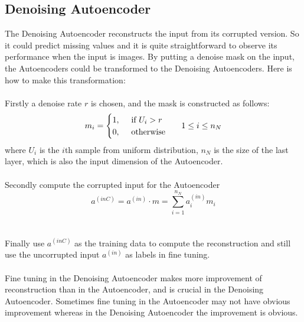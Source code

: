 \documentclass[12pt]{article}
\begin{document}
\subsection{Denoising Autoencoder}
The Denoising Autoencoder reconstructs the input from its corrupted version. So it could predict missing values and it is quite straightforward to observe its performance when the input is images. By putting a denoise mask on the input, the Autoencoders could be transformed to the Denoising Autoencoders. Here is how to make this transformation:\\
\\
Firstly a denoise rate $r$ is chosen, and the mask is constructed as follows:\begin{equation}
m_i=\begin{cases} 
1,~~~~\text{if }U_i > r\\
0,~~~~\text{otherwise}\\
\end{cases}
~~1\leq i\leq n_N\\
\end{equation}
where $U_i$ is the $i$th sample from uniform distribution, $n_N$ is the size of the last layer, which is also the input dimension of the Autoencoder.\\
\\
Secondly compute the corrupted input for the Autoencoder\begin{equation}
a^{(inC)} = a^{(in)}\cdot m = \sum_{i=1}^{n_N} a^{(in)}_im_i
\end{equation}\\
\\
Finally use $a^{(inC)}$ as the training data to compute the reconstruction and still use the uncorrupted input $a^{(in)}$ as labels in fine tuning.\\
\\
Fine tuning in the Denoising Autoencoder makes more improvement of reconstruction than in the Autoencoder, and is crucial in the Denoising Autoencoder. Sometimes fine tuning in the Autoencoder may not have obvious improvement whereas in the Denoising Autoencoder the improvement is obvious. 
\end{document}
